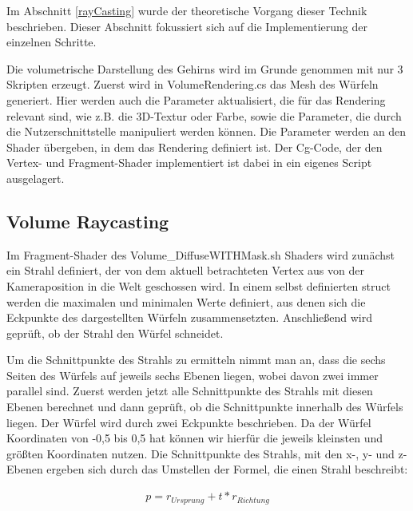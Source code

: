 Im Abschnitt \ref{rayCasting} wurde der theoretische Vorgang dieser Technik beschrieben. Dieser Abschnitt fokussiert sich auf die Implementierung der einzelnen Schritte.

Die volumetrische Darstellung des Gehirns wird im Grunde genommen mit nur 3 Skripten erzeugt. Zuerst wird in VolumeRendering.cs das Mesh des Würfeln generiert. Hier werden auch die Parameter aktualisiert, die für das Rendering relevant sind, wie z.B. die 3D-Textur oder Farbe, sowie die Parameter, die durch die Nutzerschnittstelle manipuliert werden können. 
Die Parameter werden an den Shader übergeben, in dem das Rendering definiert ist. Der Cg-Code, der den Vertex- und Fragment-Shader implementiert ist dabei in ein eigenes Script ausgelagert.

\subsection{Volume Raycasting}
\label{3dImplementierung}
Im Fragment-Shader des Volume\_DiffuseWITHMask.sh Shaders
 wird zunächst ein Strahl definiert, der von dem aktuell betrachteten Vertex aus von der Kameraposition in die Welt geschossen wird. In einem selbst definierten struct werden die maximalen und minimalen Werte definiert, aus denen sich die Eckpunkte des dargestellten Würfeln zusammensetzten. Anschließend wird geprüft, ob der Strahl den Würfel schneidet. 

Um die Schnittpunkte des Strahls zu ermitteln nimmt man an, dass die sechs Seiten des Würfels auf jeweils sechs Ebenen liegen, wobei davon zwei immer parallel sind. Zuerst werden jetzt alle Schnittpunkte des Strahls mit diesen Ebenen berechnet und dann geprüft, ob die Schnittpunkte innerhalb des Würfels liegen.
Der Würfel wird durch zwei Eckpunkte beschrieben. Da der Würfel Koordinaten von -0,5 bis 0,5 hat können wir hierfür die jeweils kleinsten und größten Koordinaten nutzen. 
Die Schnittpunkte des Strahls, mit den x-, y- und z-Ebenen ergeben sich durch das Umstellen der Formel, die einen Strahl beschreibt:

\begin{align}
p=r_{Ursprung}+t*r_{Richtung}
\end{align}

